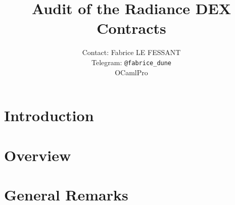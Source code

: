 \documentclass[twoside]{report}
\newif\ifsolmodules
\newif\ifsolissues
\newif\ifsoldraft
\begin{document}
\title{Audit of the Radiance DEX Contracts}
\author{Contact: Fabrice LE FESSANT\\Telegram: {\tt @fabrice\_dune}\\ OCamlPro}
\maketitle
\dominitoc
\tableofcontents
\ifsolissues
\listoffigures
\fi


\ifsoldraft
\chapter*{To edit this document}

In the report.tex file, choose:
\begin{itemize}
\item{\bf \textbackslash{}soldraftfalse} to remove draft mode (watermarks, advises)
\item{\bf \textbackslash{}solmodulestrue} to display modules by chapter instead of contracts
\item{\bf \textbackslash{}soltablestrue} to display tables for parameters and returns
\item{\bf \textbackslash{}solissuesfalse} to remove the table of issues
\end{itemize}

Issues can be entered with:
\begin{itemize}
\item{\bf \textbackslash{}issueCritical\{title\}\{text\}}
\item{\bf \textbackslash{}issueMajor\{title\}\{text\}}
\item{\bf \textbackslash{}issueMinor\{title\}\{text\}}
\end{itemize}
\fi

\chapter{Introduction}
\label{chapter:introduction}


\chapter{Overview}
\label{chapter:overview}


\chapter{General Remarks}
\label{chapter:general}




\ifsolmodules

\else

\fi
\end{document}

